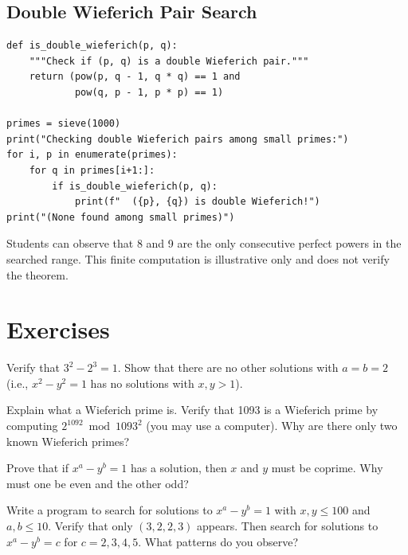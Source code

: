 \subsection{Double Wieferich Pair Search}

\begin{verbatim}
def is_double_wieferich(p, q):
    """Check if (p, q) is a double Wieferich pair."""
    return (pow(p, q - 1, q * q) == 1 and
            pow(q, p - 1, p * p) == 1)

primes = sieve(1000)
print("Checking double Wieferich pairs among small primes:")
for i, p in enumerate(primes):
    for q in primes[i+1:]:
        if is_double_wieferich(p, q):
            print(f"  ({p}, {q}) is double Wieferich!")
print("(None found among small primes)")
\end{verbatim}

\begin{highlightbox}
Students can observe that 8 and 9 are the only consecutive perfect powers in the searched range. This finite computation is illustrative only and does not verify the theorem.
\end{highlightbox}

\section{Exercises}

\begin{exercise}[Basic]
Verify that $3^2 - 2^3 = 1$. Show that there are no other solutions with $a = b = 2$ (i.e., $x^2 - y^2 = 1$ has no solutions with $x, y > 1$).
\end{exercise}

\begin{exercise}[Intermediate]
Explain what a Wieferich prime is. Verify that 1093 is a Wieferich prime by computing $2^{1092} \bmod 1093^2$ (you may use a computer). Why are there only two known Wieferich primes?
\end{exercise}

\begin{exercise}[Challenge]
Prove that if $x^a - y^b = 1$ has a solution, then $x$ and $y$ must be coprime. Why must one be even and the other odd?
\end{exercise}

\begin{exercise}
Write a program to search for solutions to $x^a - y^b = 1$ with $x, y \leq 100$ and $a, b \leq 10$. Verify that only $(3, 2, 2, 3)$ appears. Then search for solutions to $x^a - y^b = c$ for $c = 2, 3, 4, 5$. What patterns do you observe?
\end{exercise}

